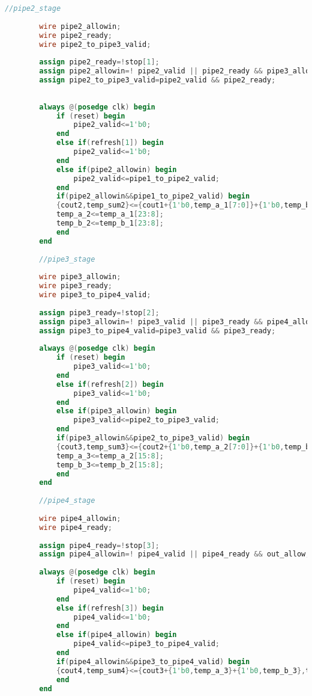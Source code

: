 \begin{lstlisting}[language=Verilog]
        //pipe2_stage
        
        wire pipe2_allowin;
        wire pipe2_ready;
        wire pipe2_to_pipe3_valid;
        
        assign pipe2_ready=!stop[1];
        assign pipe2_allowin=! pipe2_valid || pipe2_ready && pipe3_allowin;
        assign pipe2_to_pipe3_valid=pipe2_valid && pipe2_ready;
        
        
        always @(posedge clk) begin
            if (reset) begin
                pipe2_valid<=1'b0;
            end
            else if(refresh[1]) begin
                pipe2_valid<=1'b0;
            end
            else if(pipe2_allowin) begin
                pipe2_valid<=pipe1_to_pipe2_valid;
            end
            if(pipe2_allowin&&pipe1_to_pipe2_valid) begin
            {cout2,temp_sum2}<={cout1+{1'b0,temp_a_1[7:0]}+{1'b0,temp_b_1[7:0]},temp_sum1};
            temp_a_2<=temp_a_1[23:8];
            temp_b_2<=temp_b_1[23:8];
            end
        end
        
        //pipe3_stage
        
        wire pipe3_allowin;
        wire pipe3_ready;
        wire pipe3_to_pipe4_valid;
        
        assign pipe3_ready=!stop[2];
        assign pipe3_allowin=! pipe3_valid || pipe3_ready && pipe4_allowin;
        assign pipe3_to_pipe4_valid=pipe3_valid && pipe3_ready;
        
        always @(posedge clk) begin
            if (reset) begin
                pipe3_valid<=1'b0;
            end
            else if(refresh[2]) begin
                pipe3_valid<=1'b0;
            end
            else if(pipe3_allowin) begin
                pipe3_valid<=pipe2_to_pipe3_valid;
            end
            if(pipe3_allowin&&pipe2_to_pipe3_valid) begin
            {cout3,temp_sum3}<={cout2+{1'b0,temp_a_2[7:0]}+{1'b0,temp_b_2[7:0]},temp_sum2};
            temp_a_3<=temp_a_2[15:8];
            temp_b_3<=temp_b_2[15:8];
            end
        end
        
        //pipe4_stage
        
        wire pipe4_allowin;
        wire pipe4_ready;
        
        assign pipe4_ready=!stop[3];
        assign pipe4_allowin=! pipe4_valid || pipe4_ready && out_allow;
        
        always @(posedge clk) begin
            if (reset) begin
                pipe4_valid<=1'b0;
            end
            else if(refresh[3]) begin
                pipe4_valid<=1'b0;
            end
            else if(pipe4_allowin) begin
                pipe4_valid<=pipe3_to_pipe4_valid;
            end
            if(pipe4_allowin&&pipe3_to_pipe4_valid) begin
            {cout4,temp_sum4}<={cout3+{1'b0,temp_a_3}+{1'b0,temp_b_3},temp_sum3};
            end
        end
        

\end{lstlisting}
